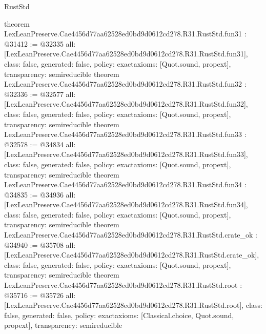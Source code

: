 \begin{lexlean}{RustStd}
\begin{coremodule}
{}
theorem LexLeanPreserve.Cae4456d77aa62528ed0bd9d0612cd278.R31.RustStd.fun31 : @31412 := @32335 {
  all: [LexLeanPreserve.Cae4456d77aa62528ed0bd9d0612cd278.R31.RustStd.fun31],
  class: false,
  generated: false,
  policy: exact{axioms: [Quot.sound, propext]},
  transparency: semireducible
}
theorem LexLeanPreserve.Cae4456d77aa62528ed0bd9d0612cd278.R31.RustStd.fun32 : @32336 := @32577 {
  all: [LexLeanPreserve.Cae4456d77aa62528ed0bd9d0612cd278.R31.RustStd.fun32],
  class: false,
  generated: false,
  policy: exact{axioms: [Quot.sound, propext]},
  transparency: semireducible
}
theorem LexLeanPreserve.Cae4456d77aa62528ed0bd9d0612cd278.R31.RustStd.fun33 : @32578 := @34834 {
  all: [LexLeanPreserve.Cae4456d77aa62528ed0bd9d0612cd278.R31.RustStd.fun33],
  class: false,
  generated: false,
  policy: exact{axioms: [Quot.sound, propext]},
  transparency: semireducible
}
theorem LexLeanPreserve.Cae4456d77aa62528ed0bd9d0612cd278.R31.RustStd.fun34 : @34835 := @34936 {
  all: [LexLeanPreserve.Cae4456d77aa62528ed0bd9d0612cd278.R31.RustStd.fun34],
  class: false,
  generated: false,
  policy: exact{axioms: [Quot.sound, propext]},
  transparency: semireducible
}
theorem LexLeanPreserve.Cae4456d77aa62528ed0bd9d0612cd278.R31.RustStd.crate_ok : @34940 := @35708 {
  all: [LexLeanPreserve.Cae4456d77aa62528ed0bd9d0612cd278.R31.RustStd.crate_ok],
  class: false,
  generated: false,
  policy: exact{axioms: [Quot.sound, propext]},
  transparency: semireducible
}
theorem LexLeanPreserve.Cae4456d77aa62528ed0bd9d0612cd278.R31.RustStd.root : @35716 := @35726 {
  all: [LexLeanPreserve.Cae4456d77aa62528ed0bd9d0612cd278.R31.RustStd.root],
  class: false,
  generated: false,
  policy: exact{axioms: [Classical.choice, Quot.sound, propext]},
  transparency: semireducible
}


\end{coremodule}
\end{lexlean}
